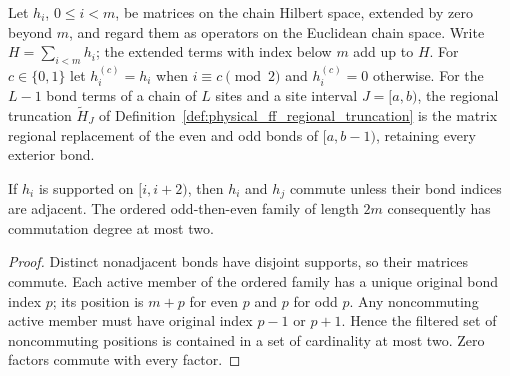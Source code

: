 \begin{definition}
    \label{def:alvv_ff_chain_operators}
    \leanok
    Let $h_i$, $0\le i<m$, be matrices on the chain Hilbert space,
    extended by zero beyond $m$, and regard them as operators on the
    Euclidean chain space. Write $H=\sum_{i<m}h_i$; the extended terms
    with index below $m$ add up to $H$.
    For $c\in\{0,1\}$ let $h_i^{(c)}=h_i$ when $i\equiv c\pmod2$
    and $h_i^{(c)}=0$ otherwise.
    For the $L-1$ bond terms of a chain of $L$ sites and a site interval
    $J=\lbrack a,b)$, the regional truncation $\widetilde H_J$ of
    Definition~\ref{def:physical_ff_regional_truncation} is the matrix
    regional replacement of the even and odd bonds of
    $\lbrack a,b-1)$, retaining every exterior bond.
\end{definition}

\begin{lemma}
    \label{lem:alvv_ff_chain_degree}
    \leanok
    If $h_i$ is supported on $\lbrack i,i+2)$, then $h_i$ and $h_j$ commute
    unless their bond indices are adjacent. The ordered odd-then-even
    family of length $2m$ consequently has commutation degree at most two.
\end{lemma}
\begin{proof}\leanok
    Distinct nonadjacent bonds have disjoint supports, so their
    matrices commute. Each active member of the ordered family has a
    unique original bond index $p$; its position is $m+p$ for even $p$
    and $p$ for odd $p$. Any noncommuting active member must have
    original index $p-1$ or $p+1$. Hence the filtered set of
    noncommuting positions is contained in a set of cardinality at most
    two. Zero factors commute with every factor.
\end{proof}

